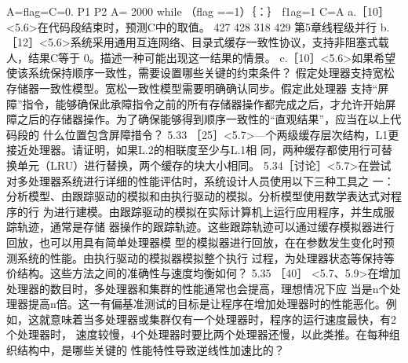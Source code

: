 A=flag=C=0.
P1
P2
A= 2000
while （flag ==1）｛：｝
f1ag=1
C=A
a.［10］<5.6>在代码段结束时，预测C中的取值。
427
428
318
429
第5章线程级并行
b.［12］<5.6>系统采用通用互连网络、目录式缓存一致性协议，支持非阻塞式载人，结果C等于
0。描述一种可能出现这一结果的情景。
c.［10］<5.6>如果希望使该系统保持顺序一致性，需要设置哪些关键的约束条件？
假定处理器支持宽松存储器一致性模型。宽松一致性模型需要明确确认同步。假定此处理器
支持“屏障”指令，能够确保此承障指令之前的所有存储器操作都完成之后，才允许开始屏
障之后的存储器操作。为了确保能够得到顺序一致性的“直观结果”，应当在以上代码段的
什么位置包含屏障措令？
5.33
［25］<5.7>—个两级缓存层次结构，L1更接近处理器。请证明，如果L.2的相联度至少与L.1相
同，两种缓存都使用行可替换单元（LRU）进行替换，两个缓存的块大小相同。
5.34［讨论］<5.7>在尝试对多处理器系统进行详细的性能评估时，系统设计人员使用以下三种工具之
一：分析模型、由跟踪驱动的模拟和由执行驱动的模拟。分析模型使用数学表达式对程序的行
为进行建模。由跟踪驱动的模拟在实际计算机上运行应用程序，并生成服踪轨迹，通常是存储
器操作的跟踪轨迹。这些跟踪轨迹可以通过缓存模拟器进行回放，也可以用具有简单处理器模
型的模拟器进行回放，在在参数发生变化时预测系统的性能。由执行驱动的模拟器模拟整个执行
过程，为处理器状态等保持等价结构。这些方法之间的准确性与速度均衡如何？
5.35
［40］ <5.7、5.9>在增加处理器的数目时，多处理器和集群的性能通常也会提高，理想情况下应
当是n个处理器提高n倍。这一有偏基准测试的目标是让程序在增加处理器时的性能恶化。例
如，这就意味着当多处理器或集群仅有一个处理器时，程序的运行速度最快，有2个处理器时，
速度较慢，4个处理器时要比两个处理器还慢，以此类推。在每种组织结构中，是哪些关键的
性能特性导致逆线性加速比的？